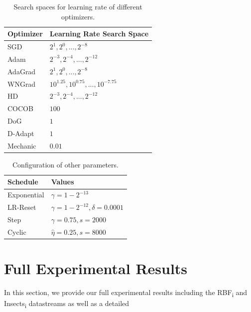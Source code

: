 \documentclass{article} %
\begin{document}
\begin{table}[h]
   \centering
   \caption{Search spaces for learning rate of different optimizers.}
   \begin{tabular}{l l}
      \toprule
      Optimizer & Learning Rate Search Space                \\
      \midrule
      SGD       & ${2^1, 2^0, ..., 2^{-8}}$                 \\
      Adam      & ${2^{-3}, 2^{-4}, ..., 2^{-12}}$          \\
      AdaGrad   & ${2^1, 2^0, ..., 2^{-8}}$                 \\
      WNGrad    & ${10^{1.25}, 10^{0.75}, ..., 10^{-7.75}}$ \\
      HD        & ${2^{-3}, 2^{-4}, ..., 2^{-12}}$          \\
      COCOB     & $100$                                     \\
      DoG       & $1$                                       \\
      D-Adapt   & $1$                                       \\
      Mechanic  & $0.01$                                    \\
      \bottomrule
   \end{tabular}
\end{table}

\begin{table}[ht]
   \centering
   \caption{Configuration of other parameters.}
   \begin{tabular}{l l}
      \toprule
      Schedule    & Values                                  \\
      \midrule
      Exponential & $\gamma = 1 - 2^{-13}$                  \\
      LR-Reset    & $\gamma = 1 - 2^{-12}, \delta = 0.0001$ \\
      Step        & $\gamma = 0.75, s = 2000$               \\
      Cyclic      & $\hat{\eta} = 0.25, s = 8000$           \\
      \bottomrule
   \end{tabular}
\end{table}

\section{Full Experimental Results}\label{app:full_results}

In this section, we provide our full experimental results including the RBF\textsubscript{i} and Insects\textsubscript{i} datastreams as well as a detailed
\end{document}
